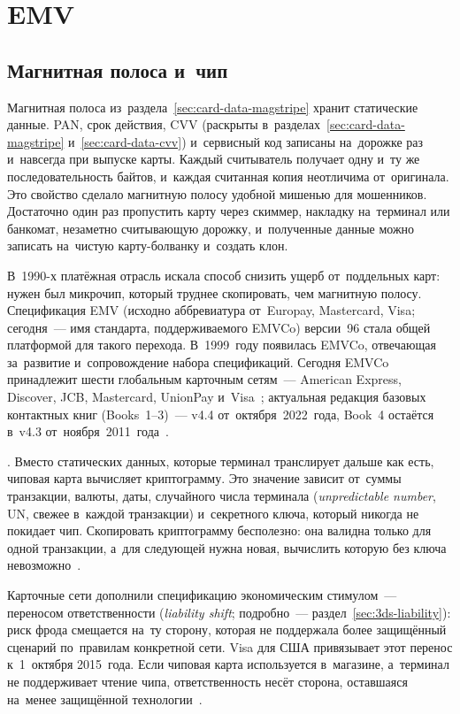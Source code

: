 
\chapter{EMV}\label{ch:emv}

\section{Магнитная полоса и~чип}\label{sec:emv-magstripe-to-chip}

Магнитная полоса из~раздела~\ref{sec:card-data-magstripe} хранит статические
данные. PAN, срок действия, CVV (раскрыты
в~разделах~\ref{sec:card-data-magstripe} и~\ref{sec:card-data-cvv}) и~сервисный
код записаны на~дорожке раз и~навсегда при выпуске карты. Каждый считыватель
получает одну и~ту же последовательность байтов, и~каждая считанная копия
неотличима от~оригинала. Это свойство сделало магнитную полосу удобной мишенью
для мошенников. Достаточно один раз пропустить карту через скиммер, накладку
на~терминал или банкомат, незаметно считывающую дорожку, и~полученные данные
можно записать на~чистую карту-болванку и~создать клон.

В~1990-х платёжная отрасль искала способ снизить ущерб от~поддельных карт:
нужен был микрочип, который труднее скопировать, чем магнитную полосу.
Спецификация EMV (исходно аббревиатура от~Europay, Mastercard, Visa;
сегодня~--- имя стандарта, поддерживаемого EMVCo) версии~96 стала общей
платформой для такого перехода. В~1999~году появилась EMVCo, отвечающая
за~развитие и~сопровождение набора спецификаций. Сегодня EMVCo принадлежит
шести глобальным карточным сетям~--- American Express, Discover, JCB,
Mastercard, UnionPay и~Visa~\cite{emvco-why-emv}; актуальная редакция базовых
контактных книг (Books~1--3)~--- v4.4 от~октября~2022~года, Book~4 остаётся
в~v4.3 от~ноября~2011~года~\cite{emvco-book1,emvco-book4}.

. Вместо статических данных, которые терминал транслирует
дальше как есть, чиповая карта вычисляет криптограмму. Это значение зависит
от~суммы транзакции, валюты, даты, случайного числа терминала
(\textit{unpredictable number}, UN, свежее в~каждой транзакции) и~секретного
ключа, который никогда не покидает чип. Скопировать криптограмму бесполезно:
она валидна только для одной транзакции, а~для следующей нужна новая, вычислить
которую без ключа невозможно~\cite{emvco-book1}.

Карточные сети дополнили спецификацию экономическим стимулом~--- переносом
ответственности (\textit{liability shift}; подробно~--- раздел~\ref{sec:3ds-liability}): риск фрода смещается
на~ту сторону, которая не поддержала более защищённый сценарий по~правилам
конкретной сети. Visa для США привязывает этот перенос к~1~октября 2015~года.
Если чиповая карта используется в~магазине, а~терминал не поддерживает чтение
чипа, ответственность несёт сторона, оставшаяся на~менее защищённой
технологии~\cite{visa-emv-liability-shift}.

